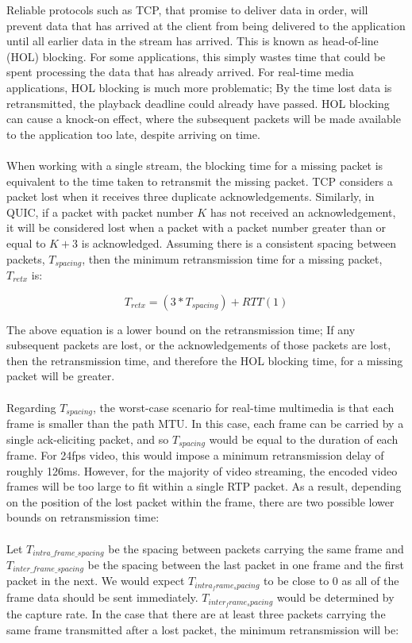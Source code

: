 \documentclass{mpaper}
\begin{document}
\noindent Reliable protocols such as TCP, that promise to deliver data in order, will prevent data that has arrived at the client from being delivered to the application until all earlier data in the stream has arrived. This is known as head-of-line (HOL) blocking. For some applications, this simply wastes time that could be spent processing the data that has already arrived. For real-time media applications, HOL blocking is much more problematic; By the time lost data is retransmitted, the playback deadline could already have passed. HOL blocking can cause a knock-on effect, where the subsequent packets will be made available to the application too late, despite arriving on time.
\\\\
When working with a single stream, the blocking time for a missing packet is equivalent to the time taken to retransmit the missing packet. TCP considers a packet lost when it receives three duplicate acknowledgements. Similarly, in QUIC, if a packet with packet number $K$ has not received an acknowledgement, it will be considered lost when a packet with a packet number greater than or equal to $K+3$ is acknowledged. Assuming there is a consistent spacing between packets, $T_{spacing}$, then the minimum retransmission time for a missing packet, $T_{retx}$ is:

\[ T_{retx} = (3*T_{spacing}) + RTT  (1)\] 

\noindent The above equation is a lower bound on the retransmission time; If any subsequent packets are lost, or the acknowledgements of those packets are lost, then the retransmission time, and therefore the HOL blocking time, for a missing packet will be greater. 
\\\\
Regarding $T_{spacing}$, the worst-case scenario for real-time multimedia is that each frame is smaller than the path MTU. In this case, each frame can be carried by a single ack-eliciting packet, and so $T_{spacing}$ would be equal to the duration of each frame. For 24fps video, this would impose a minimum retransmission delay of roughly 126ms. However, for the majority of video streaming, the encoded video frames will be too large to fit within a single RTP packet. As a result, depending on the position of the lost packet within the frame, there are two possible lower bounds on retransmission time:
\\\\
Let $T_{intra\_frame\_spacing}$ be the spacing between packets carrying the same frame and $T_{inter\_frame\_spacing}$ be the spacing between the last packet in one frame and the first packet in the next. We would expect $T_{intra_frame_spacing}$ to be close to $0$ as all of the frame data should be sent immediately. $T_{inter_frame_spacing}$ would be determined by the capture rate. In the case that there are at least three packets carrying the same frame transmitted after a lost packet, the minimum retransmission will be:
\end{document}
